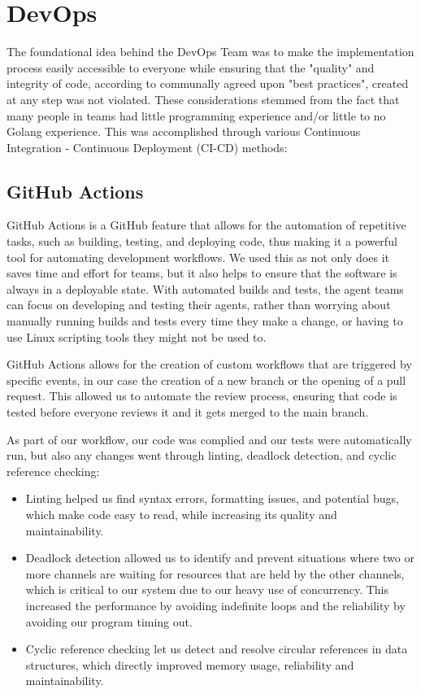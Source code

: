 \newpage

\section{DevOps}

The foundational idea behind the DevOps Team was to make the implementation process easily accessible to everyone while ensuring that the "quality" and integrity of code, according to communally agreed upon "best practices", created at any step was not violated. These considerations stemmed from the fact that many people in teams had little programming experience and/or little to no Golang experience. This was accomplished through various Continuous Integration - Continuous Deployment (CI-CD) methods:

\subsection{GitHub Actions}

GitHub Actions is a GitHub feature that allows for the automation of repetitive tasks, such as building, testing, and deploying code, thus making it a powerful tool for automating development workflows. We used this as not only does it saves time and effort for teams, but it also helps to ensure that the software is always in a deployable state. With automated builds and tests, the agent teams can focus on developing and testing their agents, rather than worrying about manually running builds and tests every time they make a change, or having to use Linux scripting tools they might not be used to.

GitHub Actions allows for the creation of custom workflows that are triggered by specific events, in our case  the creation of a new branch or the opening of a pull request. This allowed us to automate the review process, ensuring that code is tested before everyone reviews it and it gets merged to the main branch.

As part of our workflow, our code was complied and our tests were automatically run, but also any changes went through linting, deadlock detection, and cyclic reference checking:
\begin{itemize}
    \item Linting helped us find syntax errors, formatting issues, and potential bugs, which make code easy to read, while increasing its quality and maintainability.
    \item Deadlock detection allowed us to identify and prevent situations where two or more channels are waiting for resources that are held by the other channels, which is critical to our system due to our heavy use of concurrency. This increased the performance by avoiding indefinite loops and the reliability by avoiding our program timing out. 
    \item Cyclic reference checking let us detect and resolve circular references in data structures, which directly improved memory usage, reliability and maintainability. 
\end{itemize}


